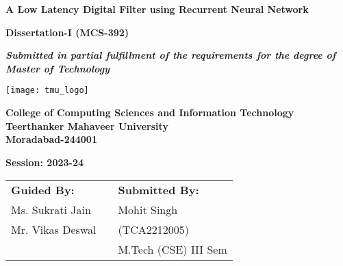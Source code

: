 \begin{titlepage}	
	\centering
	
	\LARGE \textbf{A Low Latency Digital Filter using Recurrent Neural Network}
	\vspace{1\baselineskip}
	
	\textbf{Dissertation-I (MCS-392)}\\
	\vspace{0.5\baselineskip}
	
	\large \textit{\textbf{Submitted in partial fulfillment of	the requirements for the degree of Master of Technology}}
	\vspace{0.5\baselineskip}
	
	\texttt{[image: tmu\_logo]}
	
	\LARGE \textbf{College of Computing Sciences and Information Technology\\Teerthanker Mahaveer University\\Moradabad-244001}
	\vspace{1\baselineskip}
	
	\textbf{Session: 2023-24}
	\vspace{4\baselineskip}
	
	\begin{tabularx}{\textwidth}{MMM}
		\textbf{Guided By:} & & \textbf{Submitted By:}\\
		Ms. Sukrati Jain & & Mohit Singh\\
		Mr. Vikas Deswal & & (TCA2212005)\\
		& & M.Tech (CSE) III Sem\\
	\end{tabularx}
\end{titlepage}
\clearpage
